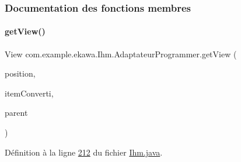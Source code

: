 \subsubsection{Documentation des fonctions membres}
\mbox{\label{classcom_1_1example_1_1ekawa_1_1_ihm_1_1_adaptateur_programmer_a948e7fa6ac9d148823e9f9dd3fba2f64}} 
\paragraph{\texorpdfstring{get\+View()}{getView()}}
{\footnotesize\ttfamily View com.\+example.\+ekawa.\+Ihm.\+Adaptateur\+Programmer.\+get\+View (\begin{DoxyParamCaption}\item[{int}]{position,  }\item[{View}]{item\+Converti,  }\item[{View\+Group}]{parent }\end{DoxyParamCaption})}



Définition à la ligne \hyperlink{_ihm_8java_source_l00212}{212} du fichier \hyperlink{_ihm_8java_source}{Ihm.\+java}.


